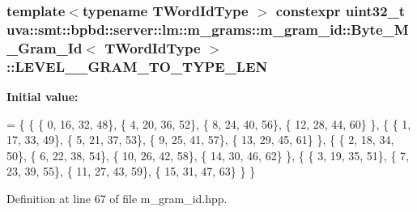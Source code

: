 \subsubsection[{L\+E\+V\+E\+L\+\_\+3\+\_\+\+G\+R\+A\+M\+\_\+\+T\+O\+\_\+\+T\+Y\+P\+E\+\_\+\+L\+E\+N}]{\setlength{\rightskip}{0pt plus 5cm}template$<$typename T\+Word\+Id\+Type $>$ constexpr uint32\+\_\+t {\bf uva\+::smt\+::bpbd\+::server\+::lm\+::m\+\_\+grams\+::m\+\_\+gram\+\_\+id\+::\+Byte\+\_\+\+M\+\_\+\+Gram\+\_\+\+Id}$<$ T\+Word\+Id\+Type $>$\+::L\+E\+V\+E\+L\+\_\+\_\+\+G\+R\+A\+M\+\_\+\+T\+O\+\_\+\+T\+Y\+P\+E\+\_\+\+L\+E\+N\hspace{0.3cm}{\ttfamily [static]}}\label{classuva_1_1smt_1_1bpbd_1_1server_1_1lm_1_1m__grams_1_1m__gram__id_1_1_byte___m___gram___id_abae28df1e61ace6a2076025e9adede10}
{\bfseries Initial value\+:}
\begin{DoxyCode}
= \{
    \{
        \{ 0, 16, 32, 48\},
        \{ 4, 20, 36, 52\},
        \{ 8, 24, 40, 56\},
        \{ 12, 28, 44, 60\}
    \},
    \{
        \{ 1, 17, 33, 49\},
        \{ 5, 21, 37, 53\},
        \{ 9, 25, 41, 57\},
        \{ 13, 29, 45, 61\}
    \},
    \{
        \{ 2, 18, 34, 50\},
        \{ 6, 22, 38, 54\},
        \{ 10, 26, 42, 58\},
        \{ 14, 30, 46, 62\}
    \},
    \{
        \{ 3, 19, 35, 51\},
        \{ 7, 23, 39, 55\},
        \{ 11, 27, 43, 59\},
        \{ 15, 31, 47, 63\}
    \}
\}
\end{DoxyCode}


Definition at line 67 of file m\+\_\+gram\+\_\+id.\+hpp.

\hypertarget{classuva_1_1smt_1_1bpbd_1_1server_1_1lm_1_1m__grams_1_1m__gram__id_1_1_byte___m___gram___id_a54fe1f83a3013ff7d262ec4827a208fb}{}
